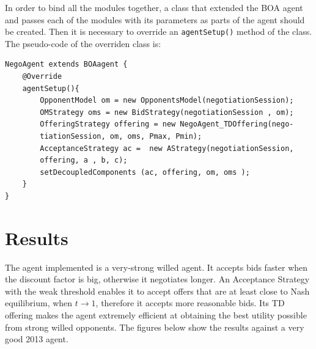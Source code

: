 \documentclass[html]{report}    %
\begin{document}
In order to bind all the modules together, a class that extended the BOA agent and passes each of the modules with its parameters as parts of the agent should be created. Then it is necessary to override an \texttt{agentSetup()} method of the class. The pseudo-code of the overriden class is:

\begin{verbatim}
NegoAgent extends BOAagent {    
    @Override
    agentSetup(){
        OpponentModel om = new OpponentsModel(negotiationSession);
        OMStrategy oms = new BidStrategy(negotiationSession , om);
        OfferingStrategy offering = new NegoAgent_TDOffering(nego-
        tiationSession, om, oms, Pmax, Pmin);
        AcceptanceStrategy ac =  new AStrategy(negotiationSession,
        offering, a , b, c);
        setDecoupledComponents (ac, offering, om, oms );
    }
}
\end{verbatim}

\section{Results}

The agent implemented is a very-strong willed agent. It accepts bids faster when the discount factor is big, otherwise it negotiates longer. An Acceptance Strategy with the weak threshold enables it to accept offers that are at least close to Nash equilibrium, when  $t\to1$, therefore it accepts more reasonable bids. Its TD offering makes the agent extremely efficient at obtaining the best utility possible from strong willed opponents. The figures below show the results against a very good 2013 agent.
\end{document}
